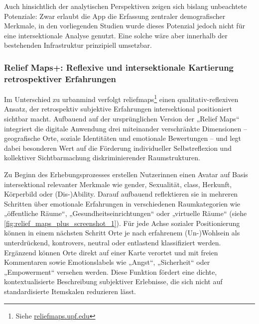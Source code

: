 Auch hinsichtlich der analytischen Perspektiven zeigen sich bislang unbeachtete Potenziale: Zwar erlaubt die App die Erfassung zentraler demografischer Merkmale, in den vorliegenden Studien wurde dieses Potenzial jedoch nicht für eine intersektionale Analyse genutzt. Eine solche wäre aber innerhalb der bestehenden Infrastruktur prinzipiell umsetzbar.

\subsubsection*{Relief Maps+: Reflexive und intersektionale Kartierung retrospektiver Erfahrungen}

Im Unterschied zu \gls{urbanmind} verfolgt \gls{reliefmaps}\footnote{Siehe \href{https://reliefmaps.upf.edu/}{reliefmaps.upf.edu}} einen qualitativ-reflexiven Ansatz, der retrospektiv subjektive Erfahrungen intersektional positioniert sichtbar macht. Aufbauend auf der ursprünglichen Version der „Relief Maps“ \parencite{rodo-de-zarateDevelopingGeographiesIntersectionality2014} integriert die digitale Anwendung drei miteinander verschränkte Dimensionen -- geografische Orte, soziale Identitäten und emotionale Bewertungen -- und legt dabei besonderen Wert auf die Förderung individueller Selbstreflexion und kollektiver Sichtbarmachung diskriminierender Raumstrukturen. %

Zu Beginn des Erhebungsprozesses erstellen Nutzer\genderstern innen einen Avatar auf Basis intersektional relevanter Merkmale wie \gls{gender}, Sexualität, \gls{class}, Herkunft, Körperbild oder (Dis-)Ability. Darauf aufbauend reflektieren sie in mehreren Schritten über emotionale Erfahrungen in verschiedenen Raumkategorien wie „öffentliche Räume“, „Gesundheitseinrichtungen“ oder „virtuelle Räume“ (siehe \cref{fig:relief_maps_plus_screenshot_1}). Für jede Achse sozialer Positionierung können in einem nächsten Schritt Orte je nach erfahrenem (Un-)Wohlsein als unterdrückend, kontrovers, neutral oder entlastend klassifiziert werden. Ergänzend können Orte direkt auf einer Karte verortet und mit freien Kommentaren sowie Emotionslabels wie „Angst“, „Sicherheit“ oder „Empowerment“ versehen werden. Diese Funktion fördert eine dichte, kontextualisierte Beschreibung subjektiver Erlebnisse, die sich nicht auf standardisierte Itemskalen reduzieren lässt.

